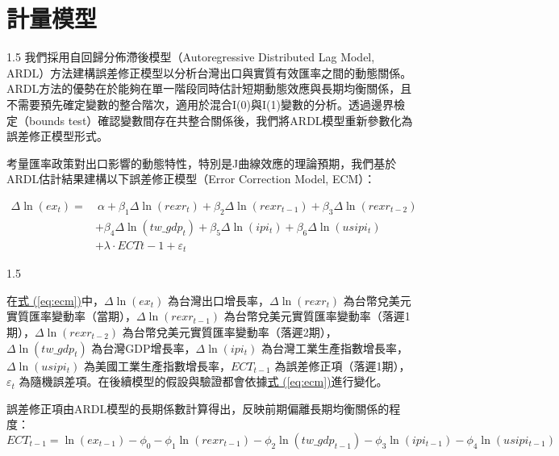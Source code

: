 \documentclass[a4paper,12pt]{article}
\begin{document}
\section{計量模型}
\begin{spacing}{1.5}
我們採用自回歸分佈滯後模型（Autoregressive Distributed Lag Model, ARDL）方法建構誤差修正模型以分析台灣出口與實質有效匯率之間的動態關係。ARDL方法的優勢在於能夠在單一階段同時估計短期動態效應與長期均衡關係，且不需要預先確定變數的整合階次，適用於混合I(0)與I(1)變數的分析。透過邊界檢定（bounds test）確認變數間存在共整合關係後，我們將ARDL模型重新參數化為誤差修正模型形式。

考量匯率政策對出口影響的動態特性，特別是J曲線效應的理論預期，我們基於ARDL估計結果建構以下誤差修正模型（Error Correction Model, ECM）：

\end{spacing}
\vspace{-1cm}
\begin{align}
\Delta \ln(ex_t) = &\ \alpha + \beta_1 \Delta \ln(rexr_t) + \beta_2 \Delta \ln(rexr_{t-1}) + \beta_3 \Delta \ln(rexr_{t-2}) \nonumber \\
&+ \beta_4 \Delta \ln(tw\_gdp_t) + \beta_5 \Delta \ln(ipi_t) + \beta_6 \Delta \ln(usipi_t) \nonumber \\
&+ \lambda\cdot ECT{t-1} + \varepsilon_t \label{eq:ecm}
\end{align}

\begin{spacing}{1.5}

在\hspace{1pt}\hyperref[eq:ecm]{式 (\ref{eq:ecm})}中，$\Delta \ln(ex_t)$ 為台灣出口增長率，$\Delta \ln(rexr_t)$ 為台幣兌美元實質匯率變動率（當期），$\Delta \ln(rexr_{t-1})$ 為台幣兌美元實質匯率變動率（落遲1期），$\Delta \ln(rexr_{t-2})$ 為台幣兌美元實質匯率變動率（落遲2期），$\Delta \ln(tw\_gdp_t)$ 為台灣GDP增長率，$\Delta \ln(ipi_t)$ 為台灣工業生產指數增長率，$\Delta \ln(usipi_t)$ 為美國工業生產指數增長率，$ECT_{t-1}$ 為誤差修正項（落遲1期），$\varepsilon_t$ 為隨機誤差項。在後續模型的假設與驗證都會依據\hspace{1pt}\hyperref[eq:ecm]{式 (\ref{eq:ecm})}進行變化。
\end{spacing}

誤差修正項由ARDL模型的長期係數計算得出，反映前期偏離長期均衡關係的程度：
\begin{equation}
ECT_{t-1} = \ln(ex_{t-1}) - \phi_0 - \phi_1 \ln(rexr_{t-1}) - \phi_2 \ln(tw\_gdp_{t-1}) - \phi_3 \ln(ipi_{t-1}) - \phi_4 \ln(usipi_{t-1}) \label{eq:ect}
\end{equation}
\end{document}
